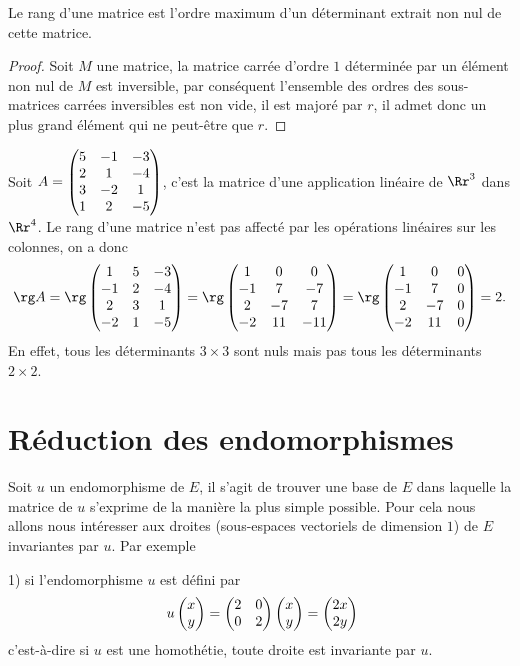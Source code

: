 \documentclass[class=report,crop=false]{standalone}
\begin{document}
\begin{corollaire}
Le rang d'une matrice est l'ordre maximum d'un déterminant extrait non nul de 
cette matrice. 
\end{corollaire} 

\begin{proof}
Soit $M$ une matrice, la matrice carrée d'ordre $1$ déterminée 
par un élément non nul de $M$ est inversible, par conséquent 
l'ensemble des ordres des sous-matrices carrées inversibles est 
non vide, il est majoré par $r$, il admet donc un plus grand 
élément qui ne peut-être que $r$.
\end{proof} 

 
\begin{exemple}
Soit $A=\left(\begin{matrix}5&-1&-3\cr2&1&-4\cr3&-2&1\cr1&2&-5\end{matrix}\right)$, c'est la matrice d'une application linéaire de $\Rr^3$ dans $\Rr^4$. Le rang d'une matrice n'est pas affecté par les opérations linéaires sur les colonnes, on a donc
$$\rg A=\rg\left(\begin{matrix}1&5&-3\cr-1&2&-4\cr2&3&1\cr-2&1&-5\end{matrix}\right)
=\rg\left(\begin{matrix}1&0&0\cr-1&7&-7\cr 2&-7&7\cr-2&11&-11\end{matrix}\right)
=\rg\left(\begin{matrix}1&0&0\cr-1&7&0\cr2&-7&0\cr-2&11&0\end{matrix}\right)=2.$$
En effet, tous les déterminants $3\times3$ sont nuls mais pas tous les déterminants $2\times2$.
\end{exemple}

\chapter{Réduction des endomorphismes}



Soit $u$ un endomorphisme de $E$, il s'agit de trouver une base de $E$ dans laquelle la matrice de $u$ s'exprime de la manière la plus simple possible. Pour cela nous allons nous intéresser aux droites (sous-espaces vectoriels de dimension $1$) de $E$ invariantes par $u$. Par exemple 
 
 1) si l'endomorphisme $u$ est défini par $$\ u\left(\begin{matrix}x\cr y\end{matrix}\right)=\left(\begin{matrix}2&0\cr0&2\end{matrix}\right)\left(\begin{matrix}x\cr y\end{matrix}\right)=
\left(\begin{matrix}2x\cr 2y\end{matrix}\right)$$ c'est-à-dire si $u$ est une homothétie, toute droite est invariante par $u$.
\end{document}
